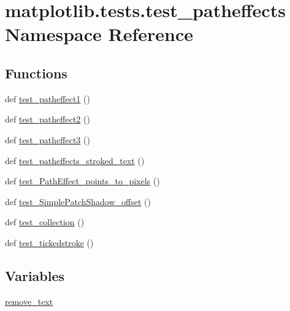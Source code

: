 \hypertarget{namespacematplotlib_1_1tests_1_1test__patheffects}{}\section{matplotlib.\+tests.\+test\+\_\+patheffects Namespace Reference}
\label{namespacematplotlib_1_1tests_1_1test__patheffects}
\subsection*{Functions}
\begin{DoxyCompactItemize}
\item 
def \hyperlink{namespacematplotlib_1_1tests_1_1test__patheffects_aed0a592a0a284365a495e6e3465c09d1}{test\+\_\+patheffect1} ()
\item 
def \hyperlink{namespacematplotlib_1_1tests_1_1test__patheffects_a7332250721628e53389dabc00037b4cd}{test\+\_\+patheffect2} ()
\item 
def \hyperlink{namespacematplotlib_1_1tests_1_1test__patheffects_a94129c01cbc4c281b41c0645ed1ad1c0}{test\+\_\+patheffect3} ()
\item 
def \hyperlink{namespacematplotlib_1_1tests_1_1test__patheffects_ab09aed39af65721a9a57ca80f37aeb8b}{test\+\_\+patheffects\+\_\+stroked\+\_\+text} ()
\item 
def \hyperlink{namespacematplotlib_1_1tests_1_1test__patheffects_afaf3a1faf9000fbaa0f21162ec55c7b1}{test\+\_\+\+Path\+Effect\+\_\+points\+\_\+to\+\_\+pixels} ()
\item 
def \hyperlink{namespacematplotlib_1_1tests_1_1test__patheffects_a3e0fc8f708ea0cb429e2bd9a9017fc05}{test\+\_\+\+Simple\+Patch\+Shadow\+\_\+offset} ()
\item 
def \hyperlink{namespacematplotlib_1_1tests_1_1test__patheffects_a5d9d6c26f7f2c05595910efacf9c6996}{test\+\_\+collection} ()
\item 
def \hyperlink{namespacematplotlib_1_1tests_1_1test__patheffects_a37782c38bd4230efad8e828b3b37162f}{test\+\_\+tickedstroke} ()
\end{DoxyCompactItemize}
\subsection*{Variables}
\begin{DoxyCompactItemize}
\item 
\hyperlink{namespacematplotlib_1_1tests_1_1test__patheffects_a5503bff7ebcf1c0c9c6aa05c82d9a4bb}{remove\+\_\+text}
\end{DoxyCompactItemize}


